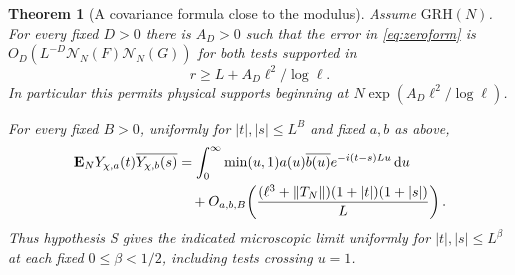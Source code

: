 \documentclass[11pt,a4paper]{article}
\numberwithin{equation}{section}
\newtheorem{theorem}{Theorem}[section]
\newcommand{\grh}{\mathrm{GRH}}
\newcommand{\ud}{\mathrm d}
\newcommand{\NN}{\mathcal N_N}
\begin{document}
\begin{theorem}[A covariance formula close to the modulus]
\label{thm:nearcriticalcovariance}
Assume $\grh(N)$. For every fixed $D>0$ there is $A_D>0$
such that the error in \cref{eq:zeroform} is
$O_D(L^{-D}\NN(F)\NN(G))$ for both tests supported in
\begin{equation}
 r\ge L+A_D\ell^2/\log\ell .
 \label{eq:nearcriticalsupport}
\end{equation}
In particular this permits physical supports beginning at
$N\exp(A_D\ell^2/\log\ell)$.

For every fixed $B>0$, uniformly for
$|t|,|s|\le L^B$ and fixed $a,b$ as above,
\begin{align}
 \mathbf E_N Y_{\chi,a}(t)\overline{Y_{\chi,b}(s)}
   &=\int_0^\infty \min(u,1)a(u)\overline{b(u)}
                     e^{-i(t-s)Lu}\,\ud u \notag\\
   &\quad+O_{a,b,B}\!\left(
     \frac{(\ell^3+\|T_N\|)(1+|t|)(1+|s|)}{L}\right).
 \label{eq:transitionmicroscopic}
\end{align}
Thus hypothesis S gives the indicated microscopic limit
uniformly for $|t|,|s|\le L^\beta$ at each fixed
$0\le\beta<1/2$, including tests crossing $u=1$.
\end{theorem}
\end{document}
